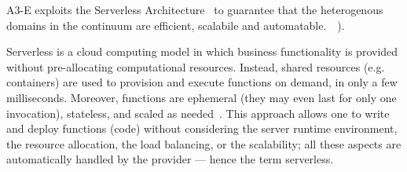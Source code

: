 


A3-E exploits the Serverless Architecture~\cite{baldini2017serverless} to guarantee that the heterogenous domains in the continuum are efficient, scalabile and automatable.~\cite{GarrigaMendonca2017}~\cite{Hendrickson:2016}).

Serverless is a cloud computing model in which business functionality is provided without pre-allocating computational resources. Instead, shared resources (e.g. containers) are used to provision and execute functions on demand, in only a few milliseconds. Moreover, functions are ephemeral (they may even last for only one invocation), stateless, and scaled as needed~\cite{Roberts:2016}. This approach allows one to write and deploy functions (code) without considering the server runtime environment, the resource allocation, the load balancing, or the scalability; all these aspects are automatically handled by the provider --- hence the term serverless.



